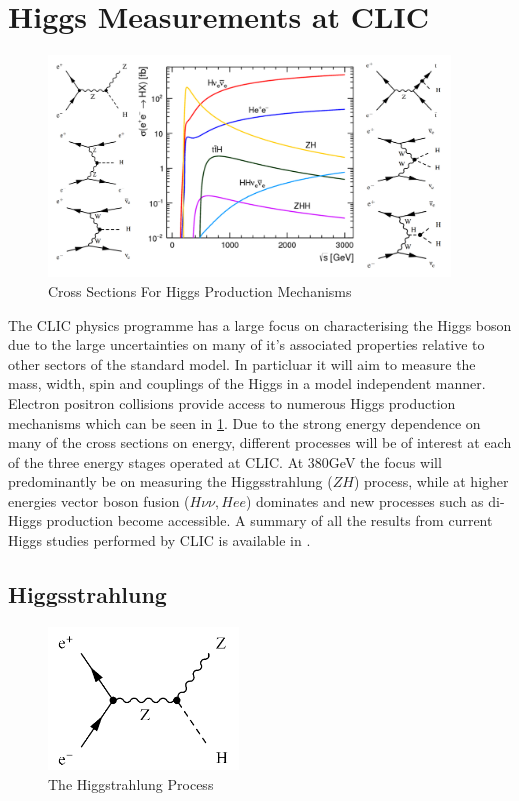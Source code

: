 \section{Higgs Measurements at CLIC}
\begin{figure}
  \centering
  \includegraphics[width=0.95\textwidth,keepaspectratio]{Theory/fig/HiggsProcessesExtra.png}
  \caption[Cross Sections For Higgs Production Mechanisms]{Cross Sections For Higgs Production Mechanisms}
  \label{fig:higgsXSecs}
\end{figure}

The CLIC physics programme has a large focus on characterising the Higgs boson due to the large uncertainties on many of it's associated properties relative to other sectors of the standard model. In particluar it will aim to measure the mass, width, spin and couplings of the Higgs in a model independent manner. Electron positron collisions provide access to numerous Higgs production mechanisms which can be seen in \ref{fig:higgsXSecs}. Due to the strong energy dependence on many of the cross sections on energy, different processes will be of interest at each of the three energy stages operated at CLIC. At 380GeV the focus will predominantly be on measuring the Higgsstrahlung ($ZH$) process, while at higher energies vector boson fusion ($H\nu\nu,Hee$) dominates and new processes such as di-Higgs production become accessible. A summary of all the results from current Higgs studies performed by CLIC is available in \cite{Abramowicz:2016zbo}.

\subsection{Higgsstrahlung}

\begin{figure}
  \centering
  \includegraphics[width=0.45\textwidth,keepaspectratio]{Theory/fig/HiggsStrahlung.png}
  \caption[The Higgstrahlung Process]{The Higgstrahlung Process}
  \label{fig:higgsstrahlung}
\end{figure}


